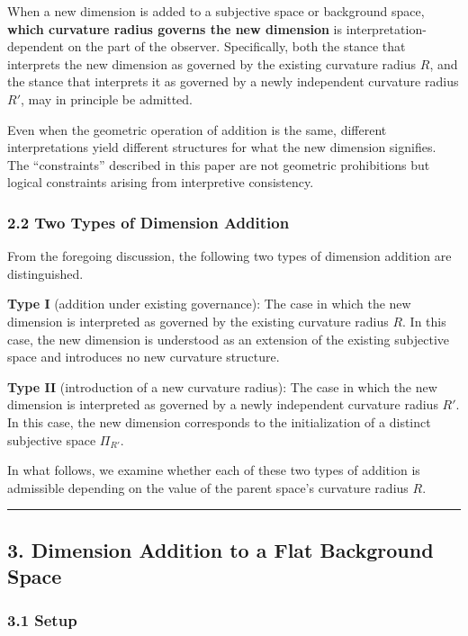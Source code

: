\documentclass[a4paper,11pt]{article}
\theoremstyle{definition}
\begin{document}
When a new dimension is added to a subjective space or background space, \textbf{which curvature radius governs the new dimension} is interpretation-dependent on the part of the observer. Specifically, both the stance that interprets the new dimension as governed by the existing curvature radius \(R\), and the stance that interprets it as governed by a newly independent curvature radius \(R'\), may in principle be admitted.

Even when the geometric operation of addition is the same, different interpretations yield different structures for what the new dimension signifies. The ``constraints'' described in this paper are not geometric prohibitions but logical constraints arising from interpretive consistency.

\subsubsection{2.2 Two Types of Dimension Addition}\label{two-types-of-dimension-addition}

From the foregoing discussion, the following two types of dimension addition are distinguished.

\textbf{Type I} (addition under existing governance): The case in which the new dimension is interpreted as governed by the existing curvature radius \(R\). In this case, the new dimension is understood as an extension of the existing subjective space and introduces no new curvature structure.

\textbf{Type II} (introduction of a new curvature radius): The case in which the new dimension is interpreted as governed by a newly independent curvature radius \(R'\). In this case, the new dimension corresponds to the initialization of a distinct subjective space \(\Pi_{R'}\).

In what follows, we examine whether each of these two types of addition is admissible depending on the value of the parent space's curvature radius \(R\).

\begin{center}\rule{0.5\linewidth}{0.5pt}\end{center}

\subsection{3. Dimension Addition to a Flat Background Space}\label{dimension-addition-to-a-flat-background-space}

\subsubsection{3.1 Setup}\label{setup}
\end{document}

